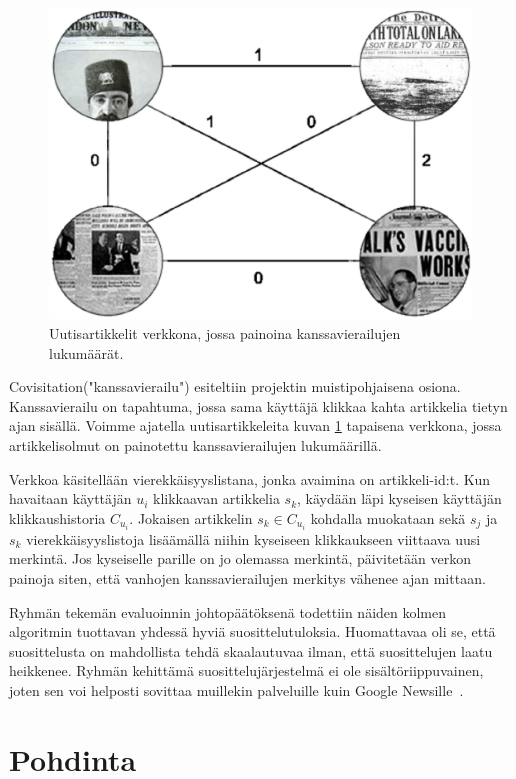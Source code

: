 \documentclass[12pt,finnish]{tktltiki2}
\theoremstyle{definition}
\theoremstyle{remark}
\begin{document}
\begin{figure}[]
\includegraphics[width = 400pt]{verkkouusitaas.eps}\caption{Uutisartikkelit verkkona, jossa painoina kanssavierailujen lukumäärät.}
\label{verkko}
\end{figure} 

Covisitation("kanssavierailu") esiteltiin projektin muistipohjaisena osiona. Kanssavierailu on tapahtuma, jossa sama käyttäjä klikkaa kahta artikkelia tietyn ajan sisällä. Voimme ajatella uutisartikkeleita kuvan \ref{verkko} tapaisena verkkona, jossa artikkelisolmut on painotettu kanssavierailujen lukumäärillä.   

Verkkoa käsitellään vierekkäisyyslistana, jonka avaimina on artikkeli-id:t.
Kun havaitaan käyttäjän $u_i$ klikkaavan artikkelia $s_k$, käydään läpi kyseisen käyttäjän klikkaushistoria $C_{u_{i}}$. Jokaisen artikkelin $s_k \in C_{u_{i}}$ kohdalla muokataan sekä $s_j$ ja $s_k$ vierekkäisyyslistoja lisäämällä niihin kyseiseen klikkaukseen viittaava uusi merkintä. Jos kyseiselle parille on jo olemassa merkintä, päivitetään verkon painoja siten, että vanhojen kanssavierailujen merkitys vähenee ajan mittaan.

Ryhmän tekemän evaluoinnin johtopäätöksenä todettiin näiden kolmen algoritmin tuottavan yhdessä hyviä suosittelutuloksia. Huomattavaa oli se, että suosittelusta on mahdollista tehdä skaalautuvaa ilman, että suosittelujen laatu heikkenee. Ryhmän kehittämä suosittelujärjestelmä ei ole sisältöriippuvainen, joten sen voi helposti sovittaa muillekin palveluille kuin Google Newsille~\cite{Das:2007:GNP:1242572.1242610}.

\section{Pohdinta}
\end{document}
